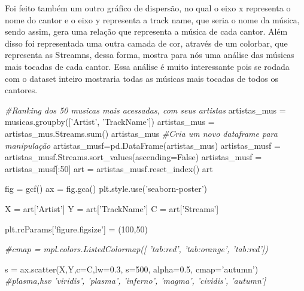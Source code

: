 \documentclass[11pt]{article}
\newenvironment{Shaded}{}{}
\newcommand{\DecValTok}[1]{\textcolor[rgb]{0.25,0.63,0.44}{{#1}}}
\newcommand{\FloatTok}[1]{\textcolor[rgb]{0.25,0.63,0.44}{{#1}}}
\newcommand{\StringTok}[1]{\textcolor[rgb]{0.25,0.44,0.63}{{#1}}}
\newcommand{\CommentTok}[1]{\textcolor[rgb]{0.38,0.63,0.69}{\textit{{#1}}}}
\newcommand{\NormalTok}[1]{{#1}}
\newcommand{\VariableTok}[1]{\textcolor[rgb]{0.10,0.09,0.49}{{#1}}}
\newcommand{\OperatorTok}[1]{\textcolor[rgb]{0.40,0.40,0.40}{{#1}}}
\newcommand{\BuiltInTok}[1]{{#1}}
\begin{document}
    Foi feito também um outro gráfico de dispersão, no qual o eixo x
representa o nome do cantor e o eixo y representa a track name, que
seria o nome da música, sendo assim, gera uma relação que representa a
música de cada cantor. Além disso foi representada uma outra camada de
cor, através de um colorbar, que representa as Streamns, dessa forma,
mostra para nós uma análise das músicas mais tocadas de cada cantor.
Essa análise é muito interessante pois se rodada com o dataset inteiro
mostraria todas as músicas mais tocadas de todos os cantores.

\begin{Shaded}
\begin{Highlighting}[]

\CommentTok{#Ranking dos 50 musicas mais acessadas, com seus artistas}
\NormalTok{artistas_mus }\OperatorTok{=}\NormalTok{ musicas.groupby([}\StringTok{'Artist'}\NormalTok{, }\StringTok{'TrackName'}\NormalTok{])}
\NormalTok{artistas_mus }\OperatorTok{=}\NormalTok{ artistas_mus.Streams.}\BuiltInTok{sum}\NormalTok{()}
\NormalTok{artistas_mus}
\CommentTok{#Cria um novo dataframe para manipulação}
\NormalTok{artistas_musf}\OperatorTok{=}\NormalTok{pd.DataFrame(artistas_mus)}
\NormalTok{artistas_musf }\OperatorTok{=}\NormalTok{ artistas_musf.Streams.sort_values(ascending}\OperatorTok{=}\VariableTok{False}\NormalTok{)}
\NormalTok{artistas_musf }\OperatorTok{=}\NormalTok{ artistas_musf[:}\DecValTok{50}\NormalTok{]}
\NormalTok{art }\OperatorTok{=}\NormalTok{ artistas_musf.reset_index()}
\NormalTok{art}

\NormalTok{fig }\OperatorTok{=}\NormalTok{ gcf()}
\NormalTok{ax }\OperatorTok{=}\NormalTok{ fig.gca()}
\NormalTok{plt.style.use(}\StringTok{'seaborn-poster'}\NormalTok{)}

\NormalTok{X }\OperatorTok{=}\NormalTok{ art[}\StringTok{'Artist'}\NormalTok{]}
\NormalTok{Y }\OperatorTok{=}\NormalTok{ art[}\StringTok{'TrackName'}\NormalTok{]}
\NormalTok{C }\OperatorTok{=}\NormalTok{ art[}\StringTok{'Streams'}\NormalTok{]}

\NormalTok{plt.rcParams[}\StringTok{'figure.figsize'}\NormalTok{] }\OperatorTok{=}\NormalTok{ (}\DecValTok{100}\NormalTok{,}\DecValTok{50}\NormalTok{)}

\CommentTok{#cmap = mpl.colors.ListedColormap([ 'tab:red', 'tab:orange',  'tab:red'])}


\NormalTok{s }\OperatorTok{=}\NormalTok{ ax.scatter(X,Y,c}\OperatorTok{=}\NormalTok{C,lw}\OperatorTok{=}\FloatTok{0.3}\NormalTok{, s}\OperatorTok{=}\DecValTok{500}\NormalTok{, alpha}\OperatorTok{=}\FloatTok{0.5}\NormalTok{,  cmap}\OperatorTok{=}\StringTok{'autumn'}\NormalTok{) }\CommentTok{#plasma,hsv  'viridis', 'plasma', 'inferno', 'magma', 'cividis', 'autumn']}


\end{Highlighting}
\end{Shaded}
\end{document}
